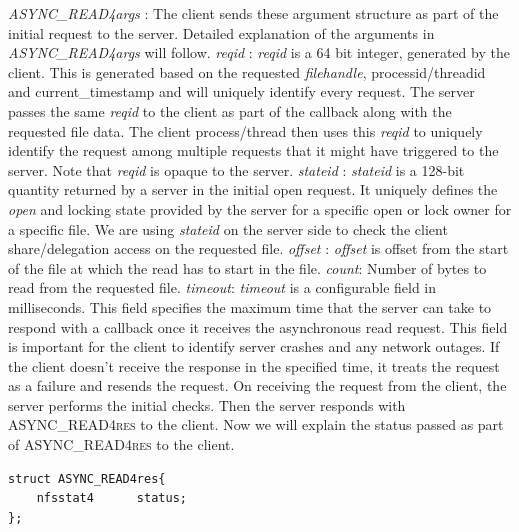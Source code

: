 \noindent\textit{ASYNC\_READ4args} : The client sends these argument structure as part of the initial request to the server. Detailed explanation of the arguments in \textit{ASYNC\_READ4args} will follow. 
\hfill \break \newline
\noindent\textit{reqid} : \textit{reqid} is a 64 bit integer, generated by the client. This is generated based on the requested \textit{filehandle}, processid/threadid and current\_timestamp and will uniquely identify every request. The server passes the same \textit{reqid} to the client as part of the callback along with the requested file data. The client process/thread then uses this  \textit{reqid} to uniquely identify the request among multiple requests that it might have triggered to the server. Note that \textit{reqid} is opaque to the server.
\hfill \break \newline
\noindent\textit{stateid} : \textit{stateid} is a 128-bit quantity returned by a server in the initial open request. It uniquely defines the \textit{open} and locking state provided by the server for a specific open or lock owner for a specific file. We are using \textit{stateid} on the server side to check the client share/delegation access on the requested file. 
\hfill \break \newline
\noindent\textit{offset} : \textit{offset} is offset from the start of the file at which the read has to start in the file. 
\hfill \break \newline
\noindent\textit{count}: Number of bytes to read from the requested file.
\hfill \break \newline
\noindent\textit{timeout}: \textit{timeout} is a configurable field in milliseconds. This field specifies the maximum time that the server can take to respond with a callback once it receives the asynchronous read request. This field is important for the client to identify server crashes and any network outages. If the client doesn't receive the response in the specified time, it treats the request as a failure and resends the request.     
\hfill \break \newline
\noindent On receiving the request from the client, the server performs the initial checks. Then the server responds with \textsc{ASYNC\_READ4res} to the client. Now we will explain the status passed as part of \textsc{ASYNC\_READ4res} to the client.  

\begin{lstlisting}
struct ASYNC_READ4res{
	nfsstat4	  status;
};
\end{lstlisting}

